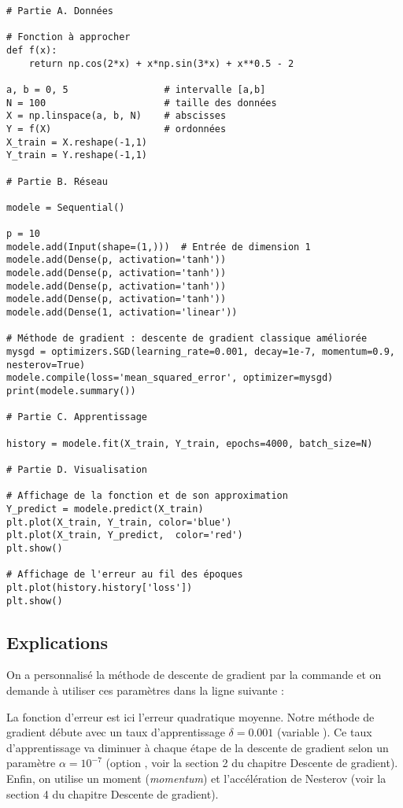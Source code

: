 \documentclass[11pt,class=report,crop=false]{standalone}
\begin{document}
\begin{lstlisting}
# Partie A. Données

# Fonction à approcher
def f(x):
    return np.cos(2*x) + x*np.sin(3*x) + x**0.5 - 2

a, b = 0, 5                 # intervalle [a,b]
N = 100                     # taille des données
X = np.linspace(a, b, N)    # abscisses
Y = f(X)                    # ordonnées
X_train = X.reshape(-1,1)
Y_train = Y.reshape(-1,1)

# Partie B. Réseau 

modele = Sequential()

p = 10
modele.add(Input(shape=(1,)))  # Entrée de dimension 1
modele.add(Dense(p, activation='tanh'))
modele.add(Dense(p, activation='tanh'))
modele.add(Dense(p, activation='tanh'))
modele.add(Dense(p, activation='tanh'))
modele.add(Dense(1, activation='linear'))

# Méthode de gradient : descente de gradient classique améliorée
mysgd = optimizers.SGD(learning_rate=0.001, decay=1e-7, momentum=0.9, nesterov=True)
modele.compile(loss='mean_squared_error', optimizer=mysgd)
print(modele.summary())

# Partie C. Apprentissage

history = modele.fit(X_train, Y_train, epochs=4000, batch_size=N)

# Partie D. Visualisation

# Affichage de la fonction et de son approximation
Y_predict = modele.predict(X_train)
plt.plot(X_train, Y_train, color='blue')
plt.plot(X_train, Y_predict,  color='red')
plt.show()

# Affichage de l'erreur au fil des époques
plt.plot(history.history['loss'])
plt.show()
\end{lstlisting}

\subsection{Explications}

On a personnalisé la méthode de descente de gradient par la commande 
et on demande à utiliser ces paramètres dans la ligne suivante :

La fonction d'erreur est ici l'erreur quadratique moyenne.
Notre méthode de gradient débute avec un taux d'apprentissage 
$\delta = 0.001$ (variable ).
Ce taux d'apprentissage va diminuer à chaque étape de la descente de gradient selon un paramètre $\alpha = 10^{-7}$ (option , voir la section 2 du chapitre \og{}Descente de gradient\fg{}).
Enfin, on utilise un moment (\emph{momentum}) et l'accélération de Nesterov (voir la section 4 du chapitre \og{}Descente de gradient\fg{}).
\end{document}
